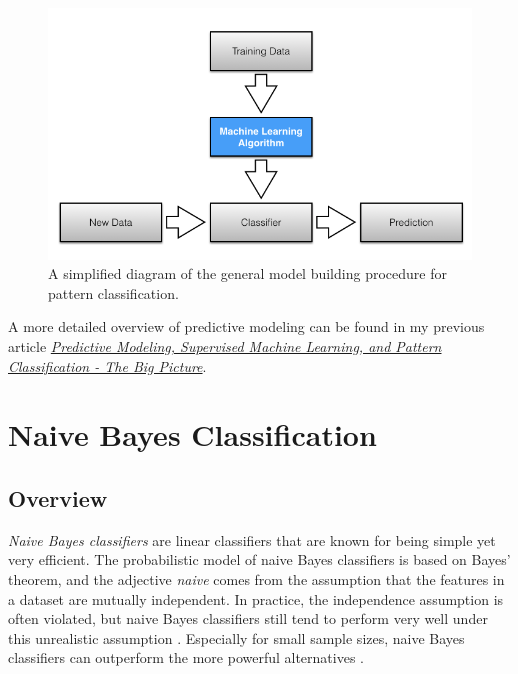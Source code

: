 \documentclass{article}
\begin{document}
\begin{figure}[h!]
\includegraphics[width=\linewidth]{../images/learning_algorithm_1.png}
\caption{A simplified diagram of the general model building procedure for pattern classification.}
\label{fig:learning_model}
\end{figure}



A more detailed overview of predictive modeling can be found in my previous article \emph{\href{http://sebastianraschka.com/Articles/2014_intro_supervised_learning.html}{Predictive Modeling, Supervised Machine Learning, and Pattern Classification - The Big Picture}}.

\section{Naive Bayes Classification}
\label{sec:naive_bayes_classification}

\subsection{Overview}
\label{sec:overview}

\emph{Naive Bayes classifiers} are linear classifiers that are known for being simple yet very efficient. The probabilistic model of naive Bayes classifiers is based on Bayes' theorem, and the adjective \emph{naive} comes from the assumption that the features in a dataset are mutually independent. In practice, the independence assumption is often violated, but naive Bayes classifiers still tend to perform very well under this unrealistic assumption \cite{rish2001empirical}. Especially for small sample sizes, naive Bayes classifiers can outperform the more powerful alternatives \cite{domingos1997optimality}.
\end{document}
